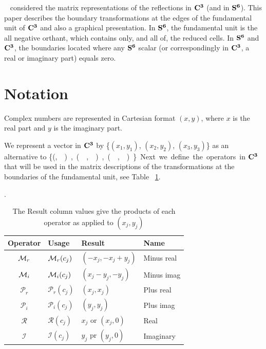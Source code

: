 \documentclass[preprint]{iucr}              %
\numberwithin{equation}{section}
\newcommand{\SVI}[0]{$\bf{S^{6}}$}
\newcommand{\CIII}[0]{$\bf{C^{3}}$}
\newcommand{\Imaginary}[0]{\mathcal{I}}
\newcommand{\Real}[0]{\mathcal{R}}
\begin{document}
	~ considered the matrix representations 
	of the reflections in \CIII{} (and in \SVI{}). 
	This paper describes the boundary transformations 
	at the edges of the fundamental	unit of \CIII{}
	and also a graphical presentation. 
	In \SVI{}, the fundamental unit is the all negative orthant, 
	which contains only, and all of, the reduced cells. 
	In \SVI{} and \CIII{}, 
	the boundaries located where any \SVI{} scalar 
	(or correspondingly in \CIII{}, a real or imaginary part) 
	equals zero. 
	
	
	
	
	\section{Notation}
	
	Complex numbers are represented 
	in Cartesian format $(x,y)$, 
	where $x$ is the real part and
	$y$ is the imaginary part.
	
	We represent a vector 
	in \CIII{} by \{$(x_1,y_1)$, $(x_2,y_2)$, $(x_3, y_3)$\} 
	as an alternative to  \{(\si,\siv ), (\sii,\sv),(\siii,\svi)\}.
	
	Next we define the operators in \CIII{} that 
	will be used in the matrix descriptions of 
	the transformations at the boundaries of the fundamental unit,
	see Table ~\ref{tab:operators}.
	
	\begin{table}	
		\label{tab:operators}
		\caption{The Result column values give the products of each operator as applied to $(x_j, y_j)$}.
		\begin{tabular}{c l l l }
			\toprule
			Operator			&Usage						&Result					&Name\\
			\midrule
			$\mathcal{M}{}_r $		&  $\mathcal{M}{}_r(c_j)$ 		& $(-x_j, -x_j+y_j)$ 	& Minus real \\ 
			$\mathcal{M}{}_i $ 		& $\mathcal{M}{}_i(c_j)$ 		& $(x_j-y_j,-y_j) $ 	& Minus imag\\ 
			$\mathcal{P}_r$ 	& $ \mathcal{P}_r(c_j)$ 	& $(x_j, x_j)$ 		& Plus real\\ 
			$\mathcal{P}_i$ 	&  $\mathcal{P}_i(c_j)$  	& $(y_j, y_j)$ 		& Plus imag\\ 
			$\Real$ 			&  $\Real(c_j)$ 			& $x_j$ or $(x_j,0)$		& Real \\ 
			$\Imaginary$ 		&  $\Imaginary(c_j)$ 		& $y_j$ pr $(y_j,0)$ 		& Imaginary\\
			\bottomrule
		\end{tabular}		
	\end{table}
	
\end{document}
